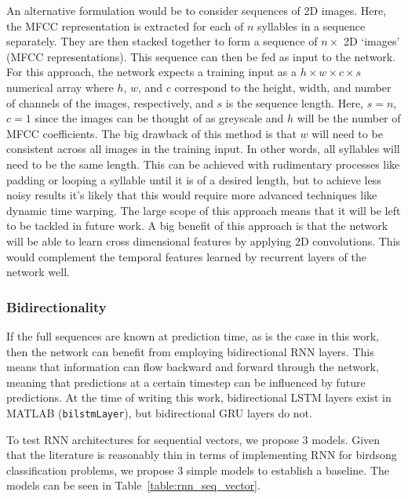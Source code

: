 An alternative formulation would be to consider sequences of 2D images. Here,
the MFCC representation is extracted for each of $n$ syllables in a sequence
separately. They are then stacked together to form a sequence of $n \times$ 2D
`images' (MFCC representations). This sequence can then be fed as input to the
network. For this approach, the network expects a training input as a $h \times
w \times c \times s$ numerical array where $h$, $w$, and $c$ correspond to the
height, width, and number of channels of the images, respectively, and $s$ is
the sequence length. Here, $s=n$, $c=1$ since the images can be thought of as
greyscale and $h$ will be the number of MFCC coefficients. The big drawback of
this method is that $w$ will need to be consistent across all images in the
training input. In other words, all syllables will need to be the same length.
This can be achieved with rudimentary processes like padding or looping a
syllable until it is of a desired length, but to achieve less noisy results it's
likely that this would require more advanced techniques like dynamic time
warping. The large scope of this approach means that it will be left to be
tackled in future work. A big benefit of this approach is that the network will
be able to learn cross dimensional features by applying 2D convolutions. This
would complement the temporal features learned by recurrent layers of the
network well.

\subsubsection{Bidirectionality}

If the full sequences are known at prediction time, as is the case in this work,
then the network can benefit from employing bidirectional RNN layers. This means
that information can flow backward and forward through the network, meaning that
predictions at a certain timestep can be influenced by future predictions. At
the time of writing this work, bidirectional LSTM layers exist in MATLAB
(\texttt{bilstmLayer}), but bidirectional GRU layers do not.

To test RNN architectures for sequential vectors, we propose 3 models.
Given that the literature is reasonably thin in terms of implementing RNN for
birdsong classification problems, we propose 3 simple models to establish a
baseline. The models can be seen in Table~\ref{table:rnn_seq_vector}.

